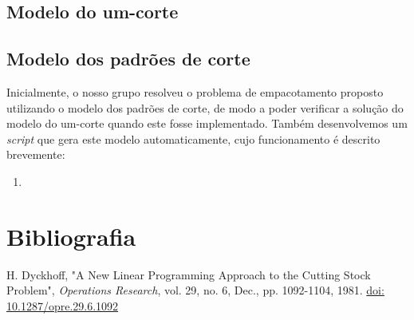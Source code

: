 \documentclass[12pt, a4paper, titlepage]{article}
\begin{document}
\subsection{Modelo do um-corte}


\subsection{Modelo dos padrões de corte}

Inicialmente, o nosso grupo resolveu o problema de empacotamento proposto utilizando o modelo dos
padrões de corte, de modo a poder verificar a solução do modelo do um-corte quando este fosse
implementado. Também desenvolvemos um \emph{script} que gera este modelo automaticamente, cujo
funcionamento é descrito brevemente:

\begin{enumerate}
	\item %
\end{enumerate}

\section{Bibliografia}
\def\refname{}
\vspace{-1.5cm}
\begin{thebibliography}{9}
    H. Dyckhoff, "A New Linear Programming Approach to the Cutting Stock Problem",
    \emph{Operations Research}, vol. 29, no. 6, Dec., pp. 1092-1104, 1981.
    \href{https://doi.org/10.1287/opre.29.6.1092}{doi: 10.1287/opre.29.6.1092}
\end{thebibliography}
\end{document}
